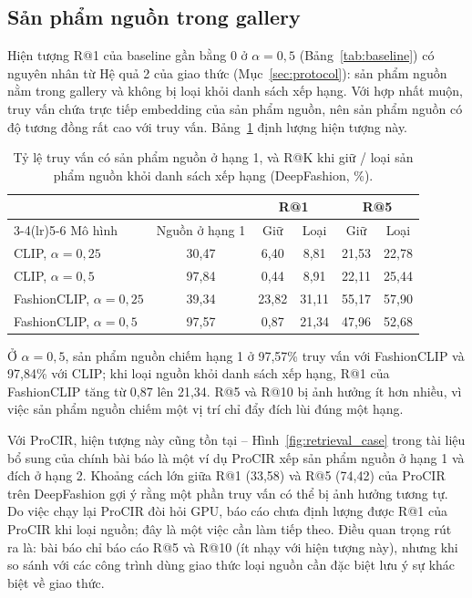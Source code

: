 \subsection{Sản phẩm nguồn trong gallery}\label{sec:source-in-gallery}

Hiện tượng R@1 của baseline gần bằng 0 ở $\alpha = 0{,}5$ (Bảng~\ref{tab:baseline}) có nguyên nhân từ Hệ quả 2 của giao thức (Mục~\ref{sec:protocol}): sản phẩm nguồn nằm trong gallery và không bị loại khỏi danh sách xếp hạng. Với hợp nhất muộn, truy vấn chứa trực tiếp embedding của sản phẩm nguồn, nên sản phẩm nguồn có độ tương đồng rất cao với truy vấn. Bảng~\ref{tab:source} định lượng hiện tượng này.

\begin{table}[h]
\centering
\caption{Tỷ lệ truy vấn có sản phẩm nguồn ở hạng 1, và R@K khi giữ / loại sản phẩm nguồn khỏi danh sách xếp hạng (DeepFashion, \%).}
\label{tab:source}
\begin{tabular}{lccccc}
\toprule
& & \multicolumn{2}{c}{R@1} & \multicolumn{2}{c}{R@5} \\
\cmidrule(lr){3-4}\cmidrule(lr){5-6}
Mô hình & Nguồn ở hạng 1 & Giữ & Loại & Giữ & Loại \\
\midrule
CLIP, $\alpha = 0{,}25$        & 30,47 & 6,40 & 8,81 & 21,53 & 22,78 \\
CLIP, $\alpha = 0{,}5$         & 97,84 & 0,44 & 8,91 & 22,11 & 25,44 \\
FashionCLIP, $\alpha = 0{,}25$ & 39,34 & 23,82 & 31,11 & 55,17 & 57,90 \\
FashionCLIP, $\alpha = 0{,}5$  & 97,57 & 0,87 & 21,34 & 47,96 & 52,68 \\
\bottomrule
\end{tabular}
\end{table}

Ở $\alpha = 0{,}5$, sản phẩm nguồn chiếm hạng 1 ở 97,57\% truy vấn với FashionCLIP và 97,84\% với CLIP; khi loại nguồn khỏi danh sách xếp hạng, R@1 của FashionCLIP tăng từ 0,87 lên 21,34. R@5 và R@10 bị ảnh hưởng ít hơn nhiều, vì việc sản phẩm nguồn chiếm một vị trí chỉ đẩy đích lùi đúng một hạng.

Với ProCIR, hiện tượng này cũng tồn tại -- Hình~\ref{fig:retrieval_case} trong tài liệu bổ sung của chính bài báo là một ví dụ ProCIR xếp sản phẩm nguồn ở hạng 1 và đích ở hạng 2. Khoảng cách lớn giữa R@1 (33,58) và R@5 (74,42) của ProCIR trên DeepFashion gợi ý rằng một phần truy vấn có thể bị ảnh hưởng tương tự. Do việc chạy lại ProCIR đòi hỏi GPU, báo cáo chưa định lượng được R@1 của ProCIR khi loại nguồn; đây là một việc cần làm tiếp theo. Điều quan trọng rút ra là: bài báo chỉ báo cáo R@5 và R@10 (ít nhạy với hiện tượng này), nhưng khi so sánh với các công trình dùng giao thức loại nguồn cần đặc biệt lưu ý sự khác biệt về giao thức.

